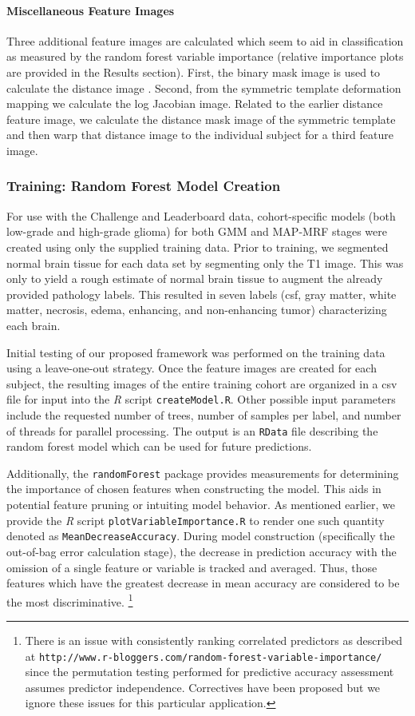 \documentclass[final,5p,times,twocolumn]{elsarticle}
\begin{document}
\paragraph{Miscellaneous Feature Images}
Three additional feature images are calculated which seem to aid in 
classification as measured by the random forest variable importance
(relative importance plots are provided in the Results section).
First, the binary mask image is used to calculate the distance image 
\citep{maurer2003}.  Second, from the symmetric template deformation 
mapping we calculate the log Jacobian image.  Related to the earlier
distance feature image, we calculate the distance mask image of the symmetric
template and then warp that distance image to the individual subject
for a third feature image.

\subsubsection{Training:  Random Forest Model Creation}

For use with the Challenge and Leaderboard data, cohort-specific models (both 
low-grade and 
high-grade glioma) for both GMM and MAP-MRF stages were created using only the 
supplied training data.  Prior to training, we segmented normal brain tissue \cite{avants2011}
for each data set by segmenting only the T1 image.  This was only to yield
a rough estimate of normal brain tissue to augment the already provided 
pathology labels.  This resulted in seven labels (csf, gray matter, white matter,
necrosis, edema, enhancing, and non-enhancing tumor)
characterizing each brain.

Initial testing of our proposed framework was performed 
on the training data using a leave-one-out strategy.  Once the
feature images are created for each subject, the resulting images of the entire
training cohort are organized in a csv file for input into the \textit{R} script
{\tt createModel.R}.  Other possible input parameters include the requested 
number of trees, number of samples per label, and number of threads for parallel
processing.  The output is an {\tt RData} file describing the random forest
model which can be used for future predictions.
 
Additionally, the {\tt randomForest} package provides  measurements 
for determining the importance of chosen features when constructing the model.  
This aids in potential feature pruning or intuiting model behavior.  As mentioned
earlier, we provide the \textit{R} script {\tt plotVariableImportance.R} to render
one such quantity denoted as {\tt MeanDecreaseAccuracy}.  During model construction
(specifically the out-of-bag error calculation stage), the decrease in prediction accuracy
with the omission of a single feature or variable is tracked and averaged.  Thus,
those features which have the greatest decrease in mean accuracy are considered
to be the most discriminative.%
\footnote{
There is an issue with consistently ranking correlated predictors as described at {\tt http://www.r-bloggers.com/random-forest-variable-importance/} since the permutation testing performed for predictive accuracy assessment assumes predictor independence.  Correctives have been proposed but we ignore these issues for this particular application.
}
\end{document}
